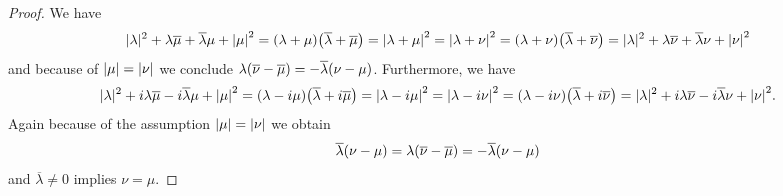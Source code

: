 \begin{proof}
	We have
	\begin{align*}
		|\lambda|^2 + \lambda \overline{\mu} + \overline{\lambda} \mu + {\left | \mu \right |}^2 = {\left ( \lambda + \mu \right )}{\left ( \overline{\lambda} + \overline{\mu} \right )} = {\left | \lambda + \mu \right |}^2 = {\left | \lambda + \nu \right |}^2 = {\left ( \lambda + \nu \right )}{\left ( \overline{\lambda} + \overline{\nu} \right )} = |\lambda|^2 + \lambda \overline{\nu} + \overline{\lambda} \nu + {\left | \nu \right |}^2
	\end{align*}
	and because of ${\left | \mu \right |} = {\left | \nu \right |}$ we conclude $\lambda{\left ( \overline{\nu} - \overline{\mu} \right )} = -\overline{\lambda} {\left ( \nu - \mu \right )}$. Furthermore, we have
	\begin{align*}
		|\lambda|^2 + i\lambda \overline{\mu} - i\overline{\lambda} \mu + {\left | \mu \right |}^2 = {\left ( \lambda - i\mu \right )}{\left ( \overline{\lambda} + i\overline{\mu} \right )} = {\left | \lambda - i\mu \right |}^2 = {\left | \lambda - i\nu \right |}^2 = {\left ( \lambda - i\nu \right )}{\left ( \overline{\lambda} + i\overline{\nu} \right )} = |\lambda|^2 + i\lambda \overline{\nu} - i\overline{\lambda} \nu + {\left | \nu \right |}^2.
	\end{align*}
	Again because of the assumption ${\left | \mu \right |} = {\left | \nu \right |}$ we obtain
	\begin{align*}
		\overline{\lambda} {\left ( \nu - \mu \right )} = \lambda{\left ( \overline{\nu} - \overline{\mu} \right )} = -\overline{\lambda} {\left ( \nu - \mu \right )}
	\end{align*}
	and $\overline{\lambda} \neq 0$ implies $\nu = \mu$.
\end{proof}